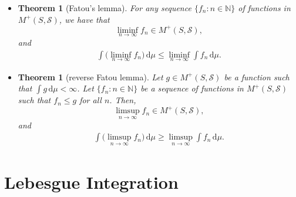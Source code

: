 \documentclass[10pt]{article}
\newtheorem{theorem}[lemma]{Theorem}
\numberwithin{lemma}{section}
\newcommand{\dee}{\mathrm{d}}
\newcommand{\mcal}[1]{\mathcal{#1}}
\newcommand{\Nat}{\mathbb{N}}
\begin{document}
\begin{itemize}
  \item \begin{theorem}[Fatou's lemma]
    For any sequence $\{ f_n : n \in \Nat \}$ of functions in $M^+(S,\mcal{S})$, we have that $$\liminf_{n \rightarrow \infty} f_n \in M^+(S,\mcal{S}),$$ and 
    \begin{align*}
      \int \Big( \liminf_{n \rightarrow \infty} f_n \Big)\, \dee\mu \leq \liminf_{n\rightarrow \infty} \int f_n\, \dee\mu.
    \end{align*}
  \end{theorem}

  \item \begin{theorem}[reverse Fatou lemma]
    Let $g \in M^+(S,\mcal{S})$ be a function such that $\int g\, \dee\mu < \infty$.
    Let $\{ f_n : n \in \Nat \}$ be a sequence of functions in $M^+(S,\mcal{S})$ such that $f_n \leq g$ for all $n$.
    Then, $$\limsup_{n \rightarrow \infty} f_n \in M^+(S,\mcal{S}),$$ and
    \begin{align*}
      \int \Big( \limsup_{n \rightarrow \infty} f_n \Big)\, \dee\mu \geq \limsup_{n\rightarrow \infty} \int f_n\, \dee\mu.
    \end{align*}
  \end{theorem}
\end{itemize}

\section{Lebesgue Integration}
\end{document}
